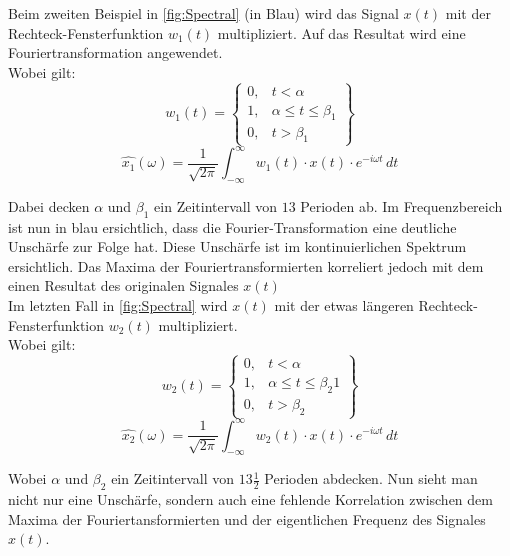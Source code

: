 Beim zweiten Beispiel in \ref{fig:Spectral} (in Blau) wird das Signal $x(t)$ mit der Rechteck-Fensterfunktion $w_{1}(t)$ multipliziert. Auf das Resultat wird eine Fouriertransformation angewendet.\\
Wobei gilt: 
\begin{equation}
	w_{1}(t)= \left\{\begin{array}{lll}{0,} & {t<\alpha}  \\ {1,}&{\alpha\leq t \leq\beta_{1}} \\ {0,} &{t>\beta_{1}}\end{array}\right\}
\end{equation}
\begin{equation}
	\hat{x_{1}}(\omega)=\frac{1}{\sqrt{2 \pi}} \int_{-\infty}^{\infty} w_{1}(t)\cdot x(t) \cdot e^{-i \omega t} \,dt
\end{equation}

Dabei decken $\alpha$ und $\beta_{1}$ ein Zeitintervall von $13$ Perioden ab. Im Frequenzbereich ist nun in blau ersichtlich, dass die Fourier-Transformation eine deutliche Unschärfe zur Folge hat. Diese Unschärfe ist im kontinuierlichen Spektrum ersichtlich. Das Maxima der Fouriertransformierten korreliert jedoch mit dem einen Resultat des originalen Signales $x(t)$\\




Im letzten Fall in \ref{fig:Spectral} wird $x(t)$ mit der etwas längeren Rechteck-Fensterfunktion $w_{2}(t)$ multipliziert.\\
Wobei gilt: 
\begin{equation}
	w_{2}(t)= \left\{\begin{array}{lll}{0,}&{t<\alpha}  \\ {1,}&{\alpha\leq t \leq\beta_{2}}  {1}\\ {0,}&{t>\beta_{2}}\end{array}\right\}
\end{equation}
\begin{equation}
	\hat{x_{2}}(\omega)=\frac{1}{\sqrt{2 \pi}} \int_{-\infty}^{\infty} w_{2}(t)\cdot x(t) \cdot e^{-i \omega t} \,dt
\end{equation}

Wobei $\alpha$ und $\beta_{2}$ ein Zeitintervall von $13\frac{1}{2}$ Perioden abdecken. Nun sieht man nicht nur eine Unschärfe, sondern auch eine fehlende Korrelation zwischen dem Maxima der Fouriertansformierten und der eigentlichen Frequenz des Signales $x(t)$.\\

